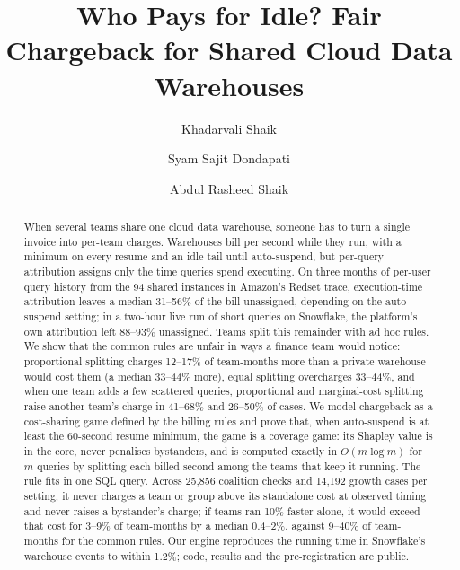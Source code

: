 \documentclass[sigconf]{acmart}
\begin{document}
\title{Who Pays for Idle? Fair Chargeback for Shared Cloud Data Warehouses}

\author{Khadarvali Shaik}
\author{Syam Sajit Dondapati}
\author{Abdul Rasheed Shaik}

\begin{abstract}
When several teams share one cloud data warehouse, someone has to turn a single invoice into per-team charges. Warehouses
bill per second while they run, with a minimum on every resume and an idle tail until auto-suspend, but per-query
attribution assigns only the time queries spend executing. On three months of per-user query history from the 94 shared
instances in Amazon's Redset trace, execution-time attribution leaves a median 31--56\% of the bill unassigned, depending
on the auto-suspend setting; in a two-hour live run of short queries on Snowflake, the platform's own attribution left 88--93\%
unassigned. Teams split this remainder with ad hoc rules. We show that the common rules are unfair in ways a finance team
would notice: proportional splitting charges 12--17\% of team-months more than a private warehouse would cost them (a median
33--44\% more), equal splitting overcharges 33--44\%, and when one team adds a few scattered queries, proportional and
marginal-cost splitting raise another team's charge in 41--68\% and 26--50\% of cases. We model chargeback as a cost-sharing game defined by the billing rules and prove that,
when auto-suspend is at least the 60-second resume minimum, the game is a coverage game: its Shapley value is in the core,
never penalises bystanders, and is computed exactly in $O(m\log m)$ for $m$ queries by splitting each billed second among
the teams that keep it running. The rule fits in one SQL query. Across 25,856 coalition checks and 14,192 growth cases
per setting, it never charges a team or group above its standalone cost at observed timing and never raises a bystander's
charge; if teams ran 10\% faster alone, it would exceed that cost for 3--9\% of team-months by a median 0.4--2\%, against
9--40\% of team-months for the common rules. Our engine
reproduces the running time in Snowflake's warehouse events to within 1.2\%; code, results and the pre-registration are public.
\end{abstract}
\end{document}
